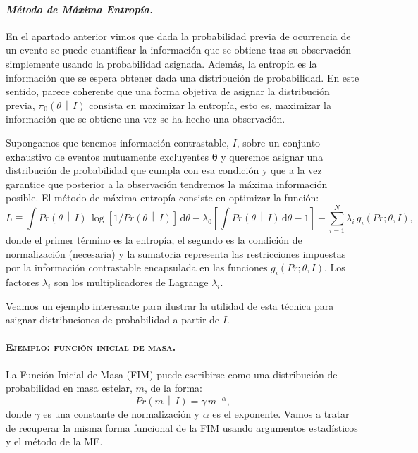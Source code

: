 \documentclass[a4paper,twoside]{article}
\newcommand{\hip}{\ensuremath{\mathbold{\theta}}\xspace}
\newcommand{\pri}[2]{\ensuremath{\pi_0\left(#1\,\middle|\, #2\right)}\xspace}
\newcommand{\pro}[2]{\ensuremath{Pr\left(#1\,\middle|\, #2\right)}\xspace}
\begin{document}
\paragraph{\textit{\color{teal}Método de Máxima Entropía.}} En el apartado anterior vimos que dada
la probabilidad previa de ocurrencia de un evento se puede cuantificar la información que se obtiene
tras su observación simplemente usando la probabilidad asignada. Además, la entropía es la
información que se espera obtener dada una distribución de probabilidad. En este sentido, parece
coherente que una forma objetiva de asignar la distribución previa, $\pri{\theta}{I}$ consista en
maximizar la entropía, esto es, maximizar la información que se obtiene una vez se ha hecho una
observación.

Supongamos que tenemos información contrastable, $I$, sobre un conjunto exhaustivo de eventos
mutuamente excluyentes $\hip$ y queremos asignar una distribución de probabilidad que cumpla con esa
condición y que a la vez garantice que posterior a la observación tendremos la máxima información
posible. El método de máxima entropía consiste en optimizar la función:
%
$$L\equiv\int\pro{\theta}{I}\,\log{\left[1/\pro{\theta}{I}\right]}\,\text{d}\theta - \lambda_0\left[\int\pro{\theta}{I}\,\text{d}\theta-1\right] - \sum_{i=1}^N \lambda_i\,g_i(Pr;\theta,I),$$
%
donde el primer término es la entropía, el segundo es la condición de normalización (necesaria) y la
sumatoria representa las restricciones impuestas por la información contrastable encapsulada en las
funciones $g_i(Pr;\theta,I)$. Los factores $\lambda_i$ son los multiplicadores de Lagrange
$\lambda_i$.

Veamos un ejemplo interesante para ilustrar la utilidad de esta técnica para asignar distribuciones
de probabilidad a partir de $I$.

\paragraph{\textsc{\color{Blue}Ejemplo: función inicial de masa.}} La Función Inicial de Masa (FIM)
puede escribirse como una distribución de probabilidad en masa estelar, $m$, de la forma:
$$\pro{m}{I} = \gamma\,m^{-\alpha},$$
%
donde $\gamma$ es una constante de normalización y $\alpha$ es el exponente. Vamos a tratar de
recuperar la misma forma funcional de la FIM usando argumentos estadísticos y el método de la ME.
\end{document}
